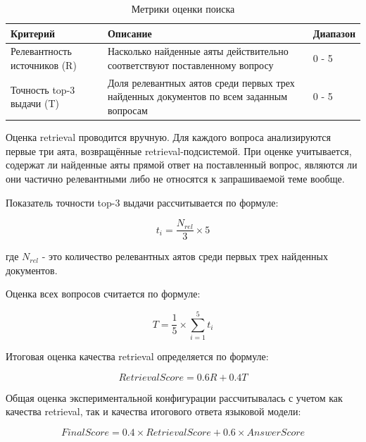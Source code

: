 \begin{table}[H]
	\centering
	\caption{Метрики оценки поиска}
	\label{tab:retrieval-metrics}
	\small
	\begin{tabular}{|p{4cm}|p{4cm}|p{4cm}|}
	\hline
		Критерий & Описание & Диапазон \\
	\hline
		Релевантность источников (R) & Насколько найденные аяты действительно соответствуют поставленному вопросу & 0 - 5 \\
	\hline
		Точность top-3 выдачи (T) & Доля релевантных аятов среди первых трех найденных документов по всем заданным вопросам & 0 - 5 \\
	\hline
	\end{tabular}
\end{table}

Оценка retrieval проводится вручную. Для каждого вопроса анализируются первые три аята, возвращённые retrieval-подсистемой. При оценке учитывается, содержат ли найденные аяты прямой ответ на поставленный вопрос, являются ли они частично релевантными либо не относятся к запрашиваемой теме вообще.

Показатель точности top-3 выдачи рассчитывается по формуле:

\begin{equation}
	t_i = \frac{N_{rel}}{3} \times 5
	\label{eq:top3-single}
\end{equation}

где $N_{rel}$ - это количество релевантных аятов среди первых трех найденных документов.

Оценка всех вопросов считается по формуле:

\begin{equation}
	T = \frac{1}{5} \times \sum_{i=1}^{5} t_i
	\label{eq:top3-avg}
\end{equation}

Итоговая оценка качества retrieval определяется по формуле:

\begin{equation}
	RetrievalScore = 0.6R + 0.4T
	\label{eq:retrieval-score}
\end{equation}

Общая оценка экспериментальной конфигурации рассчитывалась с учетом как качества retrieval, так и качества итогового ответа языковой модели:

\begin{equation}
	FinalScore = 0.4 \times RetrievalScore + 0.6 \times AnswerScore
	\label{eq:final-score}
\end{equation}

